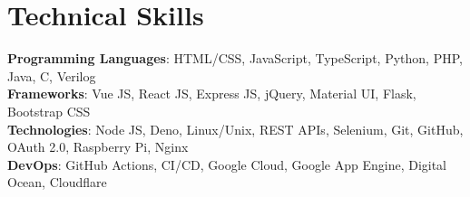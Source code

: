 \section{Technical Skills}
 \begin{itemize}[leftmargin=0.15in, label={}]
    \small{\item{
     \textbf{Programming Languages}{: HTML/CSS, JavaScript, TypeScript, Python, PHP, Java, C, Verilog} \\
     \textbf{Frameworks}{: Vue JS, React JS, Express JS, jQuery, Material UI, Flask, Bootstrap CSS } \\
     \textbf{Technologies}{: Node JS, Deno, Linux/Unix, REST APIs, Selenium, Git, GitHub, OAuth 2.0, Raspberry Pi, Nginx } \\
     \textbf{DevOps}{: GitHub Actions, CI/CD, Google Cloud, Google App Engine, Digital Ocean, Cloudflare }
    }}
 \end{itemize}
